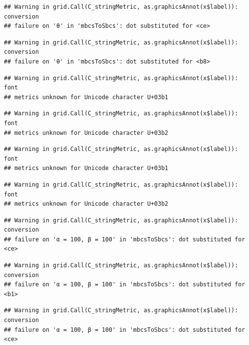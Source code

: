 \documentclass[]{book}
\theoremstyle{definition}
\theoremstyle{definition}
\theoremstyle{definition}
\theoremstyle{remark}
\begin{document}
\begin{verbatim}
## Warning in grid.Call(C_stringMetric, as.graphicsAnnot(x$label)): conversion
## failure on 'θ' in 'mbcsToSbcs': dot substituted for <ce>
\end{verbatim}

\begin{verbatim}
## Warning in grid.Call(C_stringMetric, as.graphicsAnnot(x$label)): conversion
## failure on 'θ' in 'mbcsToSbcs': dot substituted for <b8>
\end{verbatim}

\begin{verbatim}
## Warning in grid.Call(C_stringMetric, as.graphicsAnnot(x$label)): font
## metrics unknown for Unicode character U+03b1
\end{verbatim}

\begin{verbatim}
## Warning in grid.Call(C_stringMetric, as.graphicsAnnot(x$label)): font
## metrics unknown for Unicode character U+03b2
\end{verbatim}

\begin{verbatim}
## Warning in grid.Call(C_stringMetric, as.graphicsAnnot(x$label)): font
## metrics unknown for Unicode character U+03b1
\end{verbatim}

\begin{verbatim}
## Warning in grid.Call(C_stringMetric, as.graphicsAnnot(x$label)): font
## metrics unknown for Unicode character U+03b2
\end{verbatim}

\begin{verbatim}
## Warning in grid.Call(C_stringMetric, as.graphicsAnnot(x$label)): conversion
## failure on 'α = 100, β = 100' in 'mbcsToSbcs': dot substituted for <ce>
\end{verbatim}

\begin{verbatim}
## Warning in grid.Call(C_stringMetric, as.graphicsAnnot(x$label)): conversion
## failure on 'α = 100, β = 100' in 'mbcsToSbcs': dot substituted for <b1>
\end{verbatim}

\begin{verbatim}
## Warning in grid.Call(C_stringMetric, as.graphicsAnnot(x$label)): conversion
## failure on 'α = 100, β = 100' in 'mbcsToSbcs': dot substituted for <ce>
\end{verbatim}
\end{document}
